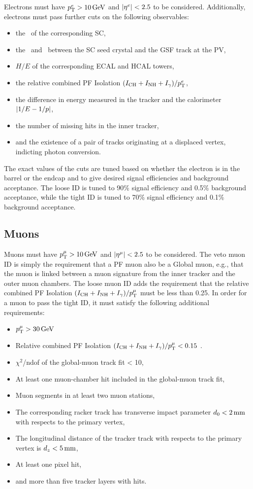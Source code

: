 Electrons must have $p_{\mathrm{T}}^{{e}} > 10\,\text{Ge\hspace{-.08em}V}$ and $\lvert \eta^{{e}} \rvert < 2.5$ to be considered.
Additionally, electrons must pass further cuts on the following observables:
\begin{itemize}
  \item the \sieie\ of the corresponding SC,
  \item the \deta\ and \dphi\ between the SC seed crystal and the GSF track at the PV,
  \item $H/E$ of the corresponding ECAL and HCAL towers,
  \item the relative combined PF Isolation $(I_{\text{CH}} + I_{\text{NH}} + I_{\gamma}) / p_{\mathrm{T}}^{{e}}$,
  \item the difference in energy measured in the tracker and the calorimeter $\lvert 1/E - 1/p \rvert$,
  \item the number of missing hits in the inner tracker,
  \item and the existence of a pair of tracks originating at a displaced vertex, indicting photon conversion.
\end{itemize}
The exact values of the cuts are tuned based on whether the electron is in the barrel or the endcap and to give desired signal efficiencies and background acceptance.
The loose ID is tuned to 90\% signal efficiency and 0.5\% background acceptance, while the tight ID is tuned to 70\% signal efficiency and 0.1\% background acceptance.

\subsection{Muons}
\label{sec:ana_muons}

Muons must have $p_{\mathrm{T}}^{{\mu}} > 10\,\text{Ge\hspace{-.08em}V}$ and $\lvert \eta^{{\mu}} \rvert < 2.5$ to be considered.
The veto muon ID is simply the requirement that a PF muon also be a Global muon, e.g., that the muon is linked between a muon signature from the inner tracker and the outer muon chambers.
The loose muon ID adds the requirement that the relative combined PF Isolation $(I_{\text{CH}} + I_{\text{NH}} + I_{\gamma}) / p_{\mathrm{T}}^{{\mu}}$ must be less than 0.25.
In order for a muon to pass the tight ID, it must satisfy the following additional requirements:
\begin{itemize}
   \item $p_{\mathrm{T}}^{{\mu}} > 30\,\text{Ge\hspace{-.08em}V}$
   \item Relative combined PF Isolation $(I_{\text{CH}} + I_{\text{NH}} + I_{\gamma}) / p_{\mathrm{T}}^{{\mu}} < 0.15$ . 
   \item $\chi^2$/ndof of the global-muon track fit < 10,
   \item At least one muon-chamber hit included in the global-muon track fit,
   \item Muon segments in at least two muon stations,
   \item The corresponding racker track has transverse impact parameter $d_0 < 2\,\text{mm}$ with respects to the primary vertex,
   \item The longitudinal distance of the tracker track with respects to the primary vertex is $d_z < 5\,\text{mm}$,
   \item At least one pixel hit,
   \item and more than five tracker layers with hits.

\end{itemize}

